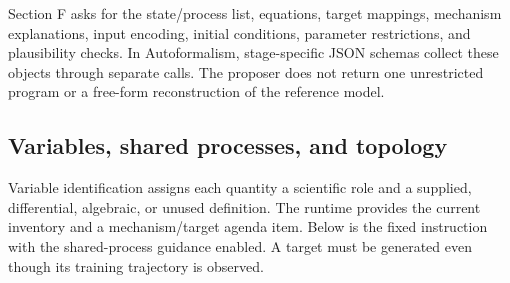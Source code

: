 Section F asks for the state/process list, equations, target mappings, mechanism
explanations, input encoding, initial conditions, parameter restrictions, and
plausibility checks. In Autoformalism, stage-specific JSON schemas collect these
objects through separate calls. The proposer does not return one unrestricted
program or a free-form reconstruction of the reference model.

\subsection{Variables, shared processes, and topology}

Variable identification assigns each quantity a scientific role and a supplied,
differential, algebraic, or unused definition. The runtime provides the current
inventory and a mechanism/target agenda item. Below is the fixed instruction with
the shared-process guidance enabled. A target must be generated even though its
training trajectory is observed.

